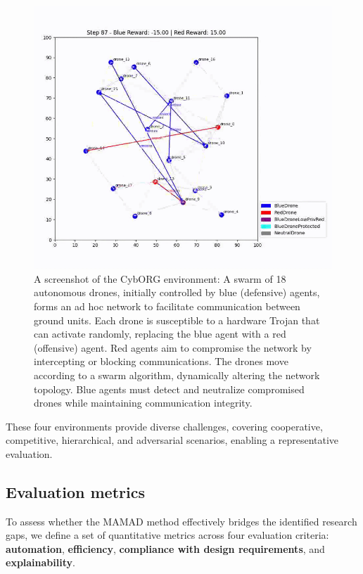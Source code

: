 \documentclass[pdflatex,sn-mathphys-num]{sn-jnl}%
\theoremstyle{thmstyleone}%
\theoremstyle{thmstyletwo}%
\theoremstyle{thmstylethree}%
\begin{document}
\begin{figure}[h!]
    \centering
    \includegraphics[width=0.6\linewidth]{figures/cyborg.png}
    \caption{A screenshot of the CybORG environment: A swarm of 18 autonomous drones, initially controlled by blue (defensive) agents, forms an ad hoc network to facilitate communication between ground units. Each drone is susceptible to a hardware Trojan that can activate randomly, replacing the blue agent with a red (offensive) agent. Red agents aim to compromise the network by intercepting or blocking communications. The drones move according to a swarm algorithm, dynamically altering the network topology. Blue agents must detect and neutralize compromised drones while maintaining communication integrity.}
    \label{fig:cyborg}
\end{figure}

\bigskip

\noindent These four environments provide diverse challenges, covering cooperative, competitive, hierarchical, and adversarial scenarios, enabling a representative evaluation.


\subsection{Evaluation metrics}

To assess whether the MAMAD method effectively bridges the identified research gaps, we define a set of quantitative metrics across four evaluation criteria: \textbf{automation}, \textbf{efficiency}, \textbf{compliance with design requirements}, and \textbf{explainability}.
\end{document}
